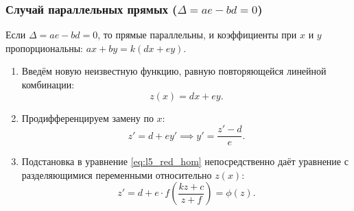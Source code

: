\subsubsection{Случай параллельных прямых ($\Delta = a e - b d = 0$)}

Если $\Delta = a e - b d = 0$, то прямые параллельны, и коэффициенты при $x$ и
$y$ пропорциональны: $a x + b y = k (d x + e y)$.
\begin{enumerate}
    \item Введём новую неизвестную функцию, равную повторяющейся линейной
    комбинации:
    \begin{equation} \label{eq:l5_par_subst}
        z(x) = d x + e y. \tag{12}
    \end{equation}
    \item Продифференцируем замену по $x$:
    \begin{equation} \label{eq:l5_par_der}
        z' = d + e y' \implies y' = \frac{z' - d}{e}. \tag{13}
    \end{equation}
    \item Подстановка в уравнение \eqref{eq:l5_red_hom} непосредственно даёт
    уравнение с разделяющимися переменными относительно $z(x)$:
    \begin{equation} \label{eq:l5_par_sep}
        z' = d + e \cdot f\left(\frac{k z + c}{z + f}\right) = \phi(z).
        \tag{14}
    \end{equation}
\end{enumerate}

